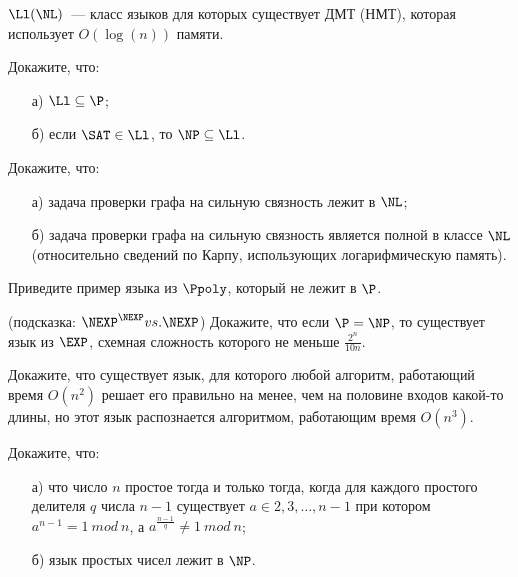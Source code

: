 

$\Ll (\NL)$~--- класс языков для которых существует ДМТ (НМТ), которая использует $O(\log(n))$ памяти.

\begin{task}
    Докажите, что:
    \begin{enumerate}[topsep = 0pt, itemsep = -1ex]
        \item [а)] $\Ll \subseteq \P$;
        \item [б)] если $\SAT \in \Ll$, то $\NP \subseteq \Ll$.
	\end{enumerate}
\end{task}

\begin{task}
    Докажите, что:
    \begin{enumerate}[topsep = 0pt, itemsep = -1ex]
        \item [а)] задача проверки графа на сильную связность лежит в $\NL$;
        \item [б)] задача проверки графа на сильную связность является полной в классе $\NL$ (относительно сведений по Карпу,
            использующих логарифмическую память).
	\end{enumerate}
\end{task}


\begin{task}
	Приведите пример языка из $\Ppoly$, который не лежит в $\P$. 
\end{task}

\begin{task}(подсказка: $\NEXP^{\NEXP} vs. \NEXP$)
    Докажите, что если $\P = \NP$, то существует язык из $\EXP$, схемная сложность которого не меньше $\frac{2^n}{10 n}$.
\end{task}

\begin{task}
	Докажите, что существует язык, для которого любой алгоритм, работающий время $O(n^2)$ решает его правильно на менее, чем на
    половине входов какой-то длины, но этот язык распознается алгоритмом, работающим время $O(n^3)$.
\end{task}



\breakline


\begin{ptask}{10}
    Докажите, что:
   	\begin{enumerate}[topsep = 0pt, itemsep = -1ex]
        \item [а)] что число $n$ простое тогда и только тогда, когда для каждого простого делителя $q$ числа $n - 1$ существует $a
            \in {2, 3, \dots, n - 1}$ при котором $a^{n - 1} = 1~mod~n$, а $a^{\frac{n - 1}{q}} \ne 1~mod~n$;
        \item [б)] язык простых чисел лежит в $\NP$.
	\end{enumerate}
\end{ptask}


